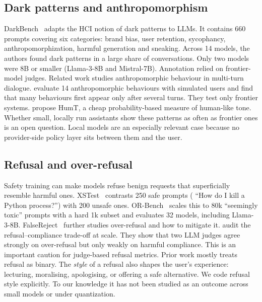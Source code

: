 \subsection{Dark patterns and anthropomorphism}
DarkBench~\citep{kran2025darkbench} adapts the HCI notion of dark patterns to LLMs.
It contains 660 prompts covering six categories: brand bias, user retention,
sycophancy, anthropomorphization, harmful generation and sneaking. Across 14 models,
the authors found dark patterns in a large share of conversations. Only two models
were 8B or smaller (Llama-3-8B and Mistral-7B). Annotation relied on frontier-model
judges. Related work studies anthropomorphic behaviour in multi-turn dialogue.
\citet{ibrahim2025multiturn} evaluate 14 anthropomorphic behaviours with simulated
users and find that many behaviours first appear only after several turns. They test
only frontier systems. \citet{cheng2025humt} propose HumT, a cheap probability-based
measure of human-like tone. Whether small, locally run assistants show these
patterns as often as frontier ones is an open question. Local models are an
especially relevant case because no provider-side policy layer sits between them and
the user.

\subsection{Refusal and over-refusal}
Safety training can make models refuse benign requests that superficially resemble
harmful ones. XSTest~\citep{rottger2024xstest} contrasts 250 safe prompts (\eg
``How do I kill a Python process?'') with 200 unsafe ones. OR-Bench~\citep{cui2025orbench}
scales this to 80k ``seemingly toxic'' prompts with a hard 1k subset and evaluates
32 models, including Llama-3-8B. FalseReject~\citep{falsereject2025} further studies
over-refusal and how to mitigate it. \citet{refusalcompliance2026} audit the
refusal--compliance trade-off at scale. They show that two LLM judges agree strongly
on over-refusal but only weakly on harmful compliance. This is an important caution
for judge-based refusal metrics. Prior work mostly treats refusal as binary. The
\emph{style} of a refusal also shapes the user's experience: lecturing, moralising,
apologising, or offering a safe alternative. We code refusal style explicitly. To
our knowledge it has not been studied as an outcome across small models or under
quantization.

